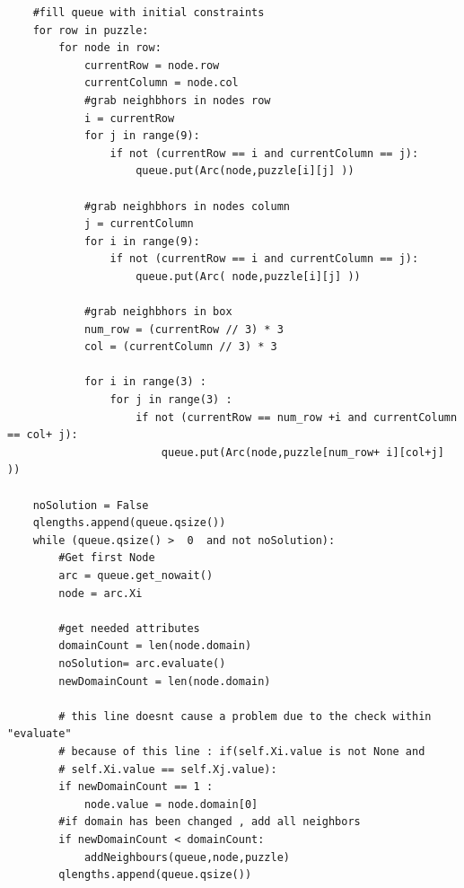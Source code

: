 \documentclass{article}
\begin{document}
\begin{verbatim}
    #fill queue with initial constraints
    for row in puzzle:
        for node in row: 
            currentRow = node.row
            currentColumn = node.col
            #grab neighbhors in nodes row
            i = currentRow
            for j in range(9): 
                if not (currentRow == i and currentColumn == j):
                    queue.put(Arc(node,puzzle[i][j] ))

            #grab neighbhors in nodes column
            j = currentColumn
            for i in range(9): 
                if not (currentRow == i and currentColumn == j):
                    queue.put(Arc( node,puzzle[i][j] ))

            #grab neighbhors in box
            num_row = (currentRow // 3) * 3
            col = (currentColumn // 3) * 3

            for i in range(3) :
                for j in range(3) :
                    if not (currentRow == num_row +i and currentColumn == col+ j):
                        queue.put(Arc(node,puzzle[num_row+ i][col+j] ))
                        
    noSolution = False
    qlengths.append(queue.qsize())
    while (queue.qsize() >  0  and not noSolution): 
        #Get first Node
        arc = queue.get_nowait()
        node = arc.Xi
        
        #get needed attributes
        domainCount = len(node.domain)
        noSolution= arc.evaluate()
        newDomainCount = len(node.domain)

        # this line doesnt cause a problem due to the check within "evaluate"
        # because of this line : if(self.Xi.value is not None and 
        # self.Xi.value == self.Xj.value):
        if newDomainCount == 1 :
            node.value = node.domain[0]
        #if domain has been changed , add all neighbors
        if newDomainCount < domainCount:
            addNeighbours(queue,node,puzzle)
        qlengths.append(queue.qsize())
\end{verbatim}
\newpage
\end{document}
